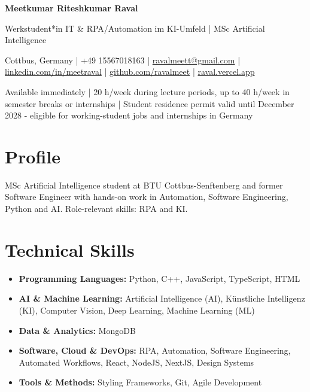 \documentclass[a4paper,10pt]{article}
\begin{document}
\begin{center}
  {\LARGE\bfseries Meetkumar Riteshkumar Raval}\par\vspace{3pt}
  {\large Werkstudent*in IT \& RPA/Automation im KI-Umfeld | MSc Artificial Intelligence}\par\vspace{3pt}
  {\small Cottbus, Germany | +49 15567018163 | \href{mailto:ravalmeett@gmail.com}{ravalmeett@gmail.com} | \href{https://www.linkedin.com/in/meetraval/}{linkedin.com/in/meetraval} | \href{https://github.com/ravalmeet}{github.com/ravalmeet} | \href{https://raval.vercel.app/}{raval.vercel.app}}\par\vspace{2pt}
  {\small Available immediately | 20 h/week during lecture periods, up to 40 h/week in semester breaks or internships | Student residence permit valid until December 2028 - eligible for working-student jobs and internships in Germany}\par
\end{center}

\section*{Profile}
MSc Artificial Intelligence student at BTU Cottbus-Senftenberg and former Software Engineer with hands-on work in Automation, Software Engineering, Python and AI. Role-relevant skills: RPA and KI.\par

\section*{Technical Skills}
\begin{itemize}
\item \textbf{Programming Languages:} Python, C++, JavaScript, TypeScript, HTML
\item \textbf{AI \& Machine Learning:} Artificial Intelligence (AI), Künstliche Intelligenz (KI), Computer Vision, Deep Learning, Machine Learning (ML)
\item \textbf{Data \& Analytics:} MongoDB
\item \textbf{Software, Cloud \& DevOps:} RPA, Automation, Software Engineering, Automated Workflows, React, NodeJS, NextJS, Design Systems
\item \textbf{Tools \& Methods:} Styling Frameworks, Git, Agile Development
\end{itemize}
\end{document}
